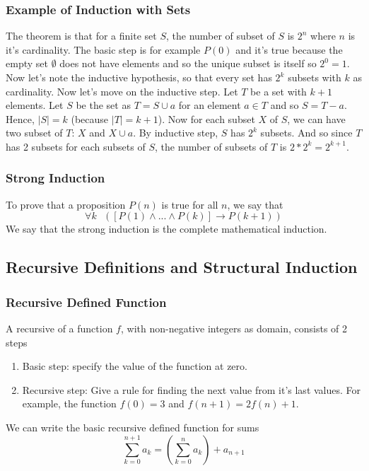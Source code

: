 \documentclass{article}
\begin{document}
\subsubsection{Example of Induction with Sets} The theorem is that for a finite set $ S $, the number of subset of $ S $ is $ 2^n $ where $ n $ is it's cardinality. The basic step is for example $ P(0) $ and it's true because the empty set $ \emptyset $ does not have elements and so the unique subset is itself so $ 2^0 = 1 $. Now let's note the inductive hypothesis, so that every set has $ 2^k $ subsets with $ k $ as cardinality. Now let's move on the inductive step. Let $ T $ be a set with $ k + 1 $ elements. Let $ S $ be the set as $ T = S \cup {a} $ for an element $ a \in T $ and so $ S = T - {a} $. Hence, $ |S| = k $ (because $ |T| = k + 1 $). Now for each subset $ X $ of $ S $, we can have two subset of $ T $: $ X $ and $ X \cup {a} $. By inductive step, $ S $ has $ 2^k $ subsets. And so since $ T $ has 2 subsets for each subsets of $ S $, the number of subsets of $ T $ is $ 2*2^k = 2^{k+1} $.

\subsubsection{Strong Induction} To prove that a proposition $ P(n) $ is true for all $ n $, we say that
\begin{equation}
\forall k \textit{ }([P(1) \wedge ... \wedge P(k)] \rightarrow P(k + 1)) 
\end{equation}
We say that the strong induction is the complete mathematical induction.

\subsection{Recursive Definitions and Structural Induction}
\subsubsection{Recursive Defined Function} A recursive of a function $ f $, with non-negative integers as domain, consists of 2 steps
\begin{enumerate}
\item Basic step: specify the value of the function at zero.
\item Recursive step: Give a rule for finding the next value from it's last values. For example, the function $ f(0) = 3 $ and $ f(n + 1) = 2f(n) + 1 $.
\end{enumerate}
We can write the basic recursive defined function for sums
\begin{equation}
\sum_{k=0}^{n+1} a_k = (\sum_{k=0}^n a_k) + a_{n+1}
\end{equation}
\end{document}
